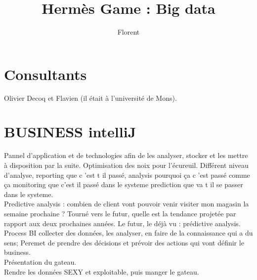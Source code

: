 \documentclass[10pt,a4paper]{article}
\author{Florent}
\title{Hermès Game : Big data}
\begin{document}
\section{Consultants}
Olivier Decoq et Flavien (il était à l'université de Mons).\\
\section{BUSINESS intelliJ}
Pannel d'application et de technologies afin de les analyser, stocker et les mettre à disposition par la suite. Optimisation des noix pour l'écureuil. Différent niveau d'analyse, reporting que c 'est t il passé, analysis pourquoi ça c 'est passé comme ça monitoring que c'est il passé dans le systeme prediction que va  t il se passer dans le systeme.
\\Predictive analysis : combien de client vont pouvoir venir visiter mon magasin la semaine prochaine ? Tourné vers le futur, quelle est la tendance projetée par rapport aux deux prochaines années. Le futur, le déjà vu : prédictive analysis.\\
Process BI collecter des données, les analyser, en faire de la connaissance qui a du sens; Peremet de prendre des décisions et prévoir des actions qui vont définir le business.\\
Présentation du gateau.\\ Rendre les données SEXY et exploitable, puis manger le gateau.
\end{document}
